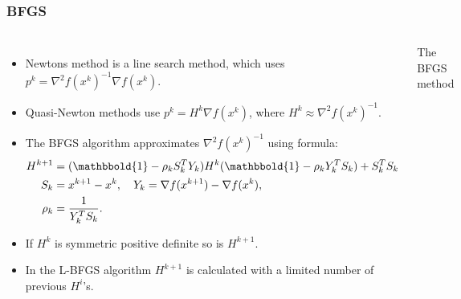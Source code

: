 \documentclass[9pt]{beamer}
\begin{document}
\begin{frame}
\frametitle{BFGS}
\begin{columns}
\begin{itemize}
\item{Newtons method is a line search method, which uses $p^k=\nabla^2f(x^k)^{-1}\nabla f(x^k)$.}
\item{Quasi-Newton methods use $p^k=H^k\nabla f(x^k)$, where $H^k\approx \nabla^2f(x^k)^{-1}$.}
\item{The BFGS algorithm approximates $\nabla^2f(x^k)^{-1}$ using formula:{\tiny
\begin{align*}
H^{k+1} &= (\mathbbold{1}-\rho_kS_k^T Y_k)H^k(\mathbbold{1} -\rho_kY_k^T S_k) + S_k^T S_k\\
S_k &= x^{k+1}-x^{k},
\quad Y_k = \nabla f(x^{k+1})-\nabla f(x^{k}),\\
\rho_k &= \frac{1}{Y_k^T S_k}.
\end{align*}
}
}
\item{If $H^k$ is symmetric positive definite so is $H^{k+1}$. }
\item{In the L-BFGS algorithm $H^{k+1}$ is calculated with a limited number of previous $H^i$'s.}
\end{itemize}
{\small
\begin{algorithm}[H] 
\caption{The BFGS method\label{SEQ_ALG}}
\end{algorithm}
}
\end{columns}
\end{frame}
\end{document}

